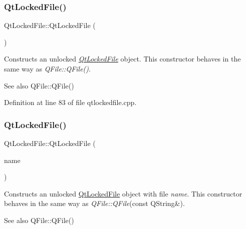 \subsubsection{\texorpdfstring{Qt\+Locked\+File()}{QtLockedFile()}\hspace{0.1cm}{\footnotesize\ttfamily [1/2]}}
{\footnotesize\ttfamily Qt\+Locked\+File\+::\+Qt\+Locked\+File (\begin{DoxyParamCaption}{ }\end{DoxyParamCaption})}

Constructs an unlocked {\itshape \hyperlink{class_qt_l_p___private_1_1_qt_locked_file}{Qt\+Locked\+File}} object. This constructor behaves in the same way as {\itshape Q\+File\+::\+Q\+File()}.

\begin{DoxySeeAlso}{See also}
Q\+File\+::\+Q\+File() 
\end{DoxySeeAlso}


Definition at line 83 of file qtlockedfile.\+cpp.

\mbox{\label{class_qt_l_p___private_1_1_qt_locked_file_a8b7a228ae02dca4bb99743219d0cdb7b}} 
\subsubsection{\texorpdfstring{Qt\+Locked\+File()}{QtLockedFile()}\hspace{0.1cm}{\footnotesize\ttfamily [2/2]}}
{\footnotesize\ttfamily Qt\+Locked\+File\+::\+Qt\+Locked\+File (\begin{DoxyParamCaption}\item[{const Q\+String \&}]{name }\end{DoxyParamCaption})}

Constructs an unlocked \hyperlink{class_qt_l_p___private_1_1_qt_locked_file}{Qt\+Locked\+File} object with file {\itshape name}. This constructor behaves in the same way as {\itshape Q\+File\+::\+Q\+File}(const Q\+String\&).

\begin{DoxySeeAlso}{See also}
Q\+File\+::\+Q\+File() 
\end{DoxySeeAlso}


